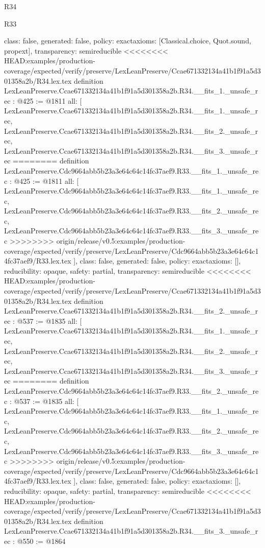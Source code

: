 \begin{lexlean}{R34}
\begin{lexlean}{R33}
\begin{coremodule}
{{{{{{{{{{{{{{{  class: false,
  generated: false,
  policy: exact{axioms: [Classical.choice, Quot.sound, propext]},
  transparency: semireducible
}
<<<<<<<< HEAD:examples/production-coverage/expected/verify/preserve/LexLeanPreserve/Ccae671332134a41b1f91a5d301358a2b/R34.lex.tex
definition LexLeanPreserve.Ccae671332134a41b1f91a5d301358a2b.R34.__fits_1._unsafe_rec : @425 := @1811 {
  all: [
    LexLeanPreserve.Ccae671332134a41b1f91a5d301358a2b.R34.__fits_1._unsafe_rec,
    LexLeanPreserve.Ccae671332134a41b1f91a5d301358a2b.R34.__fits_2._unsafe_rec,
    LexLeanPreserve.Ccae671332134a41b1f91a5d301358a2b.R34.__fits_3._unsafe_rec
========
definition LexLeanPreserve.Cdc9664abb5b23a3e64c64c14fc37aef9.R33.__fits_1._unsafe_rec : @425 := @1811 {
  all: [
    LexLeanPreserve.Cdc9664abb5b23a3e64c64c14fc37aef9.R33.__fits_1._unsafe_rec,
    LexLeanPreserve.Cdc9664abb5b23a3e64c64c14fc37aef9.R33.__fits_2._unsafe_rec,
    LexLeanPreserve.Cdc9664abb5b23a3e64c64c14fc37aef9.R33.__fits_3._unsafe_rec
>>>>>>>> origin/release/v0.5:examples/production-coverage/expected/verify/preserve/LexLeanPreserve/Cdc9664abb5b23a3e64c64c14fc37aef9/R33.lex.tex
  ],
  class: false,
  generated: false,
  policy: exact{axioms: []},
  reducibility: opaque{},
  safety: partial,
  transparency: semireducible
}
<<<<<<<< HEAD:examples/production-coverage/expected/verify/preserve/LexLeanPreserve/Ccae671332134a41b1f91a5d301358a2b/R34.lex.tex
definition LexLeanPreserve.Ccae671332134a41b1f91a5d301358a2b.R34.__fits_2._unsafe_rec : @537 := @1835 {
  all: [
    LexLeanPreserve.Ccae671332134a41b1f91a5d301358a2b.R34.__fits_1._unsafe_rec,
    LexLeanPreserve.Ccae671332134a41b1f91a5d301358a2b.R34.__fits_2._unsafe_rec,
    LexLeanPreserve.Ccae671332134a41b1f91a5d301358a2b.R34.__fits_3._unsafe_rec
========
definition LexLeanPreserve.Cdc9664abb5b23a3e64c64c14fc37aef9.R33.__fits_2._unsafe_rec : @537 := @1835 {
  all: [
    LexLeanPreserve.Cdc9664abb5b23a3e64c64c14fc37aef9.R33.__fits_1._unsafe_rec,
    LexLeanPreserve.Cdc9664abb5b23a3e64c64c14fc37aef9.R33.__fits_2._unsafe_rec,
    LexLeanPreserve.Cdc9664abb5b23a3e64c64c14fc37aef9.R33.__fits_3._unsafe_rec
>>>>>>>> origin/release/v0.5:examples/production-coverage/expected/verify/preserve/LexLeanPreserve/Cdc9664abb5b23a3e64c64c14fc37aef9/R33.lex.tex
  ],
  class: false,
  generated: false,
  policy: exact{axioms: []},
  reducibility: opaque{},
  safety: partial,
  transparency: semireducible
}
<<<<<<<< HEAD:examples/production-coverage/expected/verify/preserve/LexLeanPreserve/Ccae671332134a41b1f91a5d301358a2b/R34.lex.tex
definition LexLeanPreserve.Ccae671332134a41b1f91a5d301358a2b.R34.__fits_3._unsafe_rec : @550 := @1864 {
}}}}}}}}}}}}}}}}}
\end{coremodule}
\end{lexlean}
\end{lexlean}

